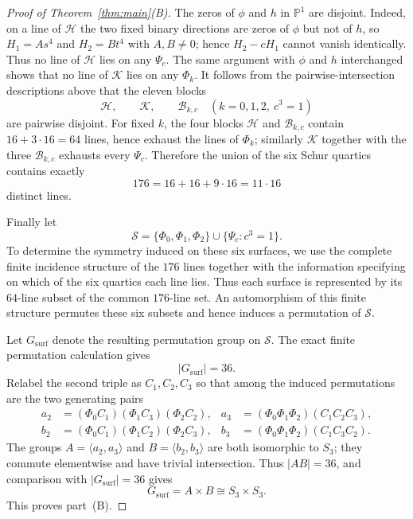 \documentclass[10pt]{article}
\newcommand{\PP}{\mathbb P}
\begin{document}
\begin{proof}[Proof of Theorem~\ref{thm:main}\textup{(B)}]
The zeros of \(\phi\) and \(h\) in \(\PP^1\) are disjoint.  Indeed, on a line of
\(\mathcal H\) the two fixed binary directions are zeros of \(\phi\) but not of \(h\), so
\(H_1=A s^4\) and \(H_2=B t^4\) with \(A,B\ne0\); hence \(H_2-cH_1\) cannot vanish identically.  Thus no line of \(\mathcal H\) lies on any \(\Psi_c\).  The same argument with \(\phi\) and \(h\) interchanged shows that no line of \(\mathcal K\) lies on any \(\Phi_k\).  It follows from the pairwise-intersection descriptions above that the eleven blocks
\[
\mathcal H,\qquad \mathcal K,\qquad
\mathcal B_{k,c}\quad(k=0,1,2,\ c^3=1)
\tag{4.8}
\]
are pairwise disjoint.  For fixed \(k\), the four blocks
\(\mathcal H\) and \(\mathcal B_{k,c}\) contain
\(16+3\cdot16=64\) lines, hence exhaust the lines of \(\Phi_k\); similarly
\(\mathcal K\) together with the three \(\mathcal B_{k,c}\) exhausts every
\(\Psi_c\).  Therefore the union of the six Schur quartics contains exactly
\[
\boxed{176=16+16+9\cdot16=11\cdot16}
\tag{4.9}
\]
distinct lines.


Finally let
\[
\mathcal S=\{\Phi_0,\Phi_1,\Phi_2\}\cup\{\Psi_c:c^3=1\}.
\]
To determine the symmetry induced on these six surfaces, we use the complete
finite incidence structure of the $176$ lines together with the information
specifying on which of the six quartics each line lies.  Thus each surface is
represented by its $64$-line subset of the common $176$-line set.  An
automorphism of this finite structure permutes these six subsets and hence
induces a permutation of $\mathcal S$.

Let $G_{\mathrm{surf}}$ denote the resulting permutation group on
$\mathcal S$.  The exact finite permutation calculation gives
\[
|G_{\mathrm{surf}}|=36.
\]
Relabel the second triple as $C_1,C_2,C_3$ so that among the induced
permutations are the two generating pairs
\[
\begin{aligned}
a_2&=(\Phi_0 C_1)(\Phi_1 C_3)(\Phi_2 C_2),&
a_3&=(\Phi_0\Phi_1\Phi_2)(C_1C_2C_3),\\
b_2&=(\Phi_0 C_1)(\Phi_1 C_2)(\Phi_2 C_3),&
b_3&=(\Phi_0\Phi_1\Phi_2)(C_1C_3C_2).
\end{aligned}
\tag{4.10}
\]
The groups $A=\langle a_2,a_3\rangle$ and $B=\langle b_2,b_3\rangle$ are both
isomorphic to $S_3$; they commute elementwise and have trivial intersection.
Thus $|AB|=36$, and comparison with $|G_{\mathrm{surf}}|=36$ gives
\[
G_{\mathrm{surf}}=A\times B\cong S_3\times S_3.
\tag{4.11}
\]
This proves part~\textup{(B)}.
\end{proof}
\end{document}
